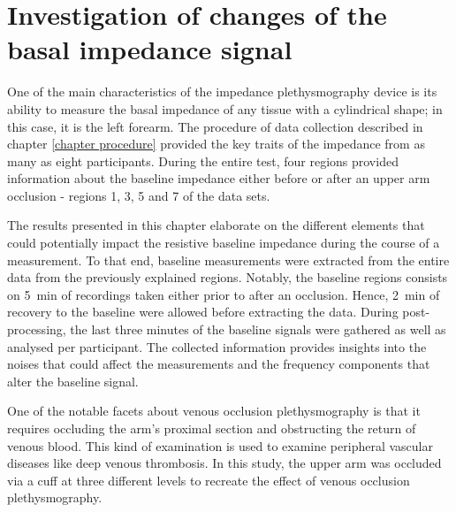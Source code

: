 
\chapter{Investigation of changes of the basal impedance signal}  %
\label{chapter basal}

\ifpdf
\graphicspath{{Chapter6/Figs/Raster/}{Chapter6/Figs/PDF/}{Chapter6/Figs/}}
\else
\graphicspath{{Chapter6/Figs/Vector/}{Chapter6/Figs/}}
\fi


One of the main characteristics of the impedance plethysmography device is its ability to measure the basal impedance of any tissue with a cylindrical shape; in this case, it is the left forearm. The procedure of data collection described in chapter \ref{chapter procedure} provided the key traits of the impedance from as many as eight participants. During the entire test, four regions provided information about the baseline impedance either before or after an upper arm occlusion - regions 1, 3, 5 and 7 of the data sets. 

The results presented in this chapter elaborate on the different elements that could potentially impact the resistive baseline impedance during the course of a measurement. To that end, baseline measurements were extracted from the entire data from the previously explained regions. Notably, the baseline regions consists on \SI{5}{\minute} of recordings taken either prior to after an occlusion. Hence, \SI{2}{\minute} of recovery to the baseline were allowed before extracting the data. During post-processing, the last three minutes of the baseline signals were gathered as well as analysed per participant. The collected information provides insights into the noises that could affect the measurements and the frequency components that alter the baseline signal. 

One of the notable facets about venous occlusion plethysmography is that it requires occluding the arm's proximal section and obstructing the return of venous blood. This kind of examination is used to examine peripheral vascular diseases like deep venous thrombosis.  In this study, the upper arm was occluded via a cuff at three different levels to recreate the effect of venous occlusion plethysmography.

